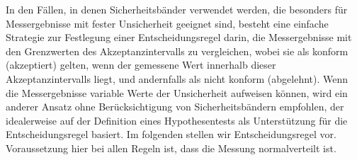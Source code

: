 In den Fällen, in denen Sicherheitsbänder verwendet werden, die besonders für Messergebnisse mit fester Unsicherheit geeignet sind, besteht eine einfache Strategie zur Festlegung einer Entscheidungsregel darin, die Messergebnisse mit den Grenzwerten des Akzeptanzintervalls zu vergleichen, wobei sie als konform (akzeptiert) gelten, wenn der gemessene Wert innerhalb dieser Akzeptanzintervalls liegt, und andernfalls als nicht konform (abgelehnt).
Wenn die Messergebnisse variable Werte der Unsicherheit aufweisen können, wird ein anderer Ansatz ohne Berücksichtigung von Sicherheitsbändern empfohlen, der idealerweise auf der Definition eines Hypothesentests als Unterstützung für die Entscheidungsregel basiert.
Im folgenden stellen wir Entscheidungsregel vor. Voraussetzung hier bei allen Regeln ist, dass die Messung normalverteilt ist.  


